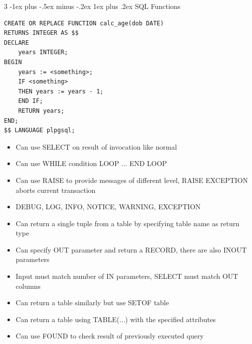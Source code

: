 \documentclass[10pt, landscape]{article}
\makeatletter
\renewcommand{\subsection}{\@startsection{subsection}{3}{0mm}%
                                {-1ex plus -.5ex minus -.2ex}%
                                {1ex plus .2ex}%
                                {\normalfont\small\bfseries}}%
\makeatother
\begin{document}
\begin{multicols*}{3}
\subsection{SQL Functions}
\begin{verbatim}
CREATE OR REPLACE FUNCTION calc_age(dob DATE)
RETURNS INTEGER AS $$
DECLARE
    years INTEGER;
BEGIN
    years := <something>;
    IF <something>
    THEN years := years - 1;
    END IF;
    RETURN years;
END;
$$ LANGUAGE plpgsql;
\end{verbatim}
\begin{itemize}
    \item Can use SELECT on result of invocation like normal
    \item Can use WHILE condition LOOP ... END LOOP
    \item Can use RAISE to provide messages of different level, RAISE EXCEPTION aborts current transaction
    \item DEBUG, LOG, INFO, NOTICE, WARNING, EXCEPTION
    \item Can return a single tuple from a table by specifying table name as return type
    \item Can specify OUT parameter and return a RECORD, there are also INOUT parameters
    \item Input must match number of IN parameters, SELECT must match OUT columns
    \item Can return a table similarly but use SETOF table
    \item Can return a table using TABLE(...) with the specified attributes
    \item Can use FOUND to check result of previously executed query
\end{itemize}


\end{multicols*}
\end{document}
